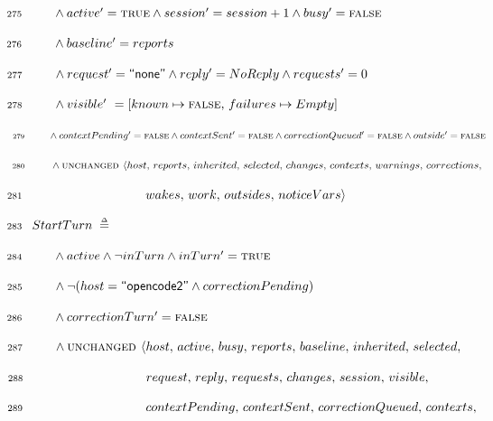 \documentclass{article}
\makeatletter
\newcommand{\defeq}{\;\mathrel{\smash   %
    {{\stackrel{\scriptscriptstyle\Delta}{=}}}}\;}
\newcommand{\FALSE}{\textsc{false}}
\newcommand{\TRUE}{\textsc{true}}
\newcommand{\UNCHANGED}{\textsc{unchanged }}
\renewcommand{\_}{\rule{.4em}{.06em}\hspace{.05em}}
\newif\ifpcalshading \pcalshadingfalse
\newlength{\pcalvspace}\setlength{\pcalvspace}{0pt}%
\newcommand{\@pvspace}[1]{%
  \ifpcalshading
     \par\global\setlength{\pcalvspace}{#1}%
  \else
     \par\vspace{#1}%
  \fi
}
\renewcommand{\.}[1]{\ensuremath{\mbox{}#1\mbox{}}}
\newcommand{\@s}[1]{\hspace{#1pt}}
\newlength{\@xlen}
\newcommand\xtstrut%
  {\setlength{\@xlen}{1.05em}%
   \addtolength{\@xlen}{\pcalvspace}%
    \raisebox{\vshadelen}{\raisebox{-.25em}{\rule{0pt}{\@xlen}}}%
   \global\setlength{\vshadelen}{0pt}%
   \global\setlength{\pcalvspace}{0pt}}
\newcommand{\@x}[1]{\par
  \ifpcalshading
  \makebox[0pt][l]{\shadebox{\xtstrut\hspace*{\textwidth}}}%
  \fi
  \mbox{$\mbox{}#1\mbox{}$}}
\newcommand{\@w}[1]{\textsf{``{#1}''}}
\def\graymargin{1}
\newlength{\templena}
\newlength{\templenb}
\newcommand{\shadebox}[1]{{\setlength{\fboxsep}{\graymargin pt}%
     \savebox{\tempboxa}{#1}%
     \settoheight{\templena}{\usebox{\tempboxa}}%
     \settodepth{\templenb}{\usebox{\tempboxa}}%
     \hspace*{-\fboxsep}\raisebox{0pt}[\templena][\templenb]%
        {\colorbox{boxshade}{\usebox{\tempboxa}}}\hspace*{-\fboxsep}}}
\newlength{\vshadelen}
\makeatother
\begin{document}
 \@x{\makebox[0pt][r]{\scriptsize 275\hspace{1em}}\@s{16.4} \.{\land} active
 \.{'} \.{=} {\TRUE} \.{\land} session \.{'} \.{=} session \.{+} 1 \.{\land}
 busy \.{'} \.{=} {\FALSE}}%
 \@x{\makebox[0pt][r]{\scriptsize 276\hspace{1em}}\@s{16.4} \.{\land} baseline
 \.{'} \.{=} reports}%
 \@x{\makebox[0pt][r]{\scriptsize 277\hspace{1em}}\@s{16.4} \.{\land} request
 \.{'} \.{=}\@w{none} \.{\land} reply \.{'} \.{=} NoReply \.{\land} requests
 \.{'} \.{=} 0}%
 \@x{\makebox[0pt][r]{\scriptsize 278\hspace{1em}}\@s{16.4} \.{\land} visible
 \.{'}\@s{3.39} \.{=} [ known \.{\mapsto} {\FALSE} ,\, failures \.{\mapsto}
 Empty ]}%
 \@x{\makebox[0pt][r]{\scriptsize 279\hspace{1em}}\@s{16.4} \.{\land}
 contextPending \.{'} \.{=} {\FALSE} \.{\land} contextSent \.{'} \.{=}
 {\FALSE} \.{\land} correctionQueued \.{'} \.{=} {\FALSE} \.{\land} outside
 \.{'} \.{=} {\FALSE}}%
 \@x{\makebox[0pt][r]{\scriptsize 280\hspace{1em}}\@s{16.4} \.{\land}
 {\UNCHANGED} {\langle} host ,\, reports ,\, inherited ,\, selected ,\,
 changes ,\, contexts ,\, warnings ,\, corrections ,\,}%
 \@x{\makebox[0pt][r]{\scriptsize 281\hspace{1em}}\@s{89.98} wakes ,\, work
 ,\, outsides ,\, noticeVars {\rangle}}%
\@pvspace{8.0pt}%
\@x{\makebox[0pt][r]{\scriptsize 283\hspace{1em}} StartTurn \.{\defeq}}%
 \@x{\makebox[0pt][r]{\scriptsize 284\hspace{1em}}\@s{16.4} \.{\land} active
 \.{\land} {\lnot} inTurn \.{\land} inTurn \.{'} \.{=} {\TRUE}}%
 \@x{\makebox[0pt][r]{\scriptsize 285\hspace{1em}}\@s{16.4} \.{\land} {\lnot}
 ( host \.{=}\@w{opencode2} \.{\land} correctionPending )}%
 \@x{\makebox[0pt][r]{\scriptsize 286\hspace{1em}}\@s{16.4} \.{\land}
 correctionTurn \.{'} \.{=} {\FALSE}}%
 \@x{\makebox[0pt][r]{\scriptsize 287\hspace{1em}}\@s{16.4} \.{\land}
 {\UNCHANGED} {\langle} host ,\, active ,\, busy ,\, reports ,\, baseline ,\,
 inherited ,\, selected ,\,}%
 \@x{\makebox[0pt][r]{\scriptsize 288\hspace{1em}}\@s{89.98} request ,\, reply
 ,\, requests ,\, changes ,\, session ,\, visible ,\,}%
 \@x{\makebox[0pt][r]{\scriptsize 289\hspace{1em}}\@s{89.98} contextPending
 ,\, contextSent ,\, correctionQueued ,\, contexts ,\,}%
\end{document}
